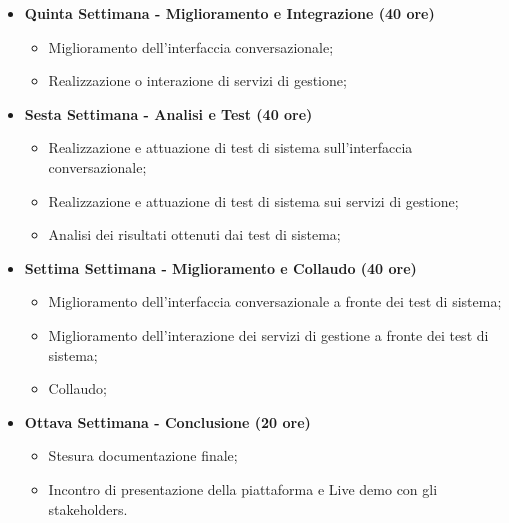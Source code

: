 {\begin{itemize}
        \item \textbf{Quinta Settimana - Miglioramento e Integrazione (40 ore)} 
        \begin{itemize}
            \item Miglioramento dell'interfaccia conversazionale;
            \item Realizzazione o interazione di servizi di gestione;
        \end{itemize}
        \item \textbf{Sesta Settimana - Analisi e Test (40 ore)} 
        \begin{itemize}
            \item Realizzazione e attuazione di test di sistema sull'interfaccia conversazionale;
            \item Realizzazione e attuazione di test di sistema sui servizi di gestione;
            \item Analisi dei risultati ottenuti dai test di sistema;
        \end{itemize}
    \newpage
        \item \textbf{Settima Settimana - Miglioramento e Collaudo (40 ore)} 
        \begin{itemize}
            \item Miglioramento dell'interfaccia conversazionale a fronte dei test di sistema;
			\item Miglioramento dell'interazione dei servizi di gestione a fronte dei test di sistema;
            \item Collaudo;
        \end{itemize}
        \item \textbf{Ottava Settimana - Conclusione (20 ore)} 
        \begin{itemize}
            \item Stesura documentazione finale;
            \item Incontro di presentazione della piattaforma e Live demo con gli stakeholders.
        \end{itemize}
    \end{itemize}
}

\newcommand{\totaleOre}{300}

\newcommand{\obiettiviObbligatori}{
	 \item \underline{\textit{O01}}: Realizzazione interfaccia conversazionale completa descritta in fase di analisi con eventuale servizio di gestione simulato.
}

\newcommand{\obiettiviDesiderabili}{
	 \item \underline{\textit{D01}}: Realizzazione del servizio di gestione compresa l'interazione con un database.
}

\newcommand{\obiettiviFacoltativi}{
	 \item \underline{\textit{F01}}: Orchestrazione con i servizi esterni (per esempio, invio notifiche sms).
}